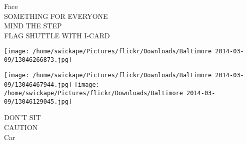 \documentclass[10pt,letterpaper]{article}
\begin{document}
Face\\
SOMETHING FOR EVERYONE\\
MIND THE STEP\\
FLAG SHUTTLE WITH I{-}CARD\\
\pagebreak

\texttt{[image: /home/swickape/Pictures/flickr/Downloads/Baltimore 2014-03-09/13046266873.jpg]}

\vspace{0.25in}
\texttt{[image: /home/swickape/Pictures/flickr/Downloads/Baltimore 2014-03-09/13046467944.jpg]}
\texttt{[image: /home/swickape/Pictures/flickr/Downloads/Baltimore 2014-03-09/13046129045.jpg]}

DON'T SIT\\
CAUTION\\
Car\\
\pagebreak
\end{document}
